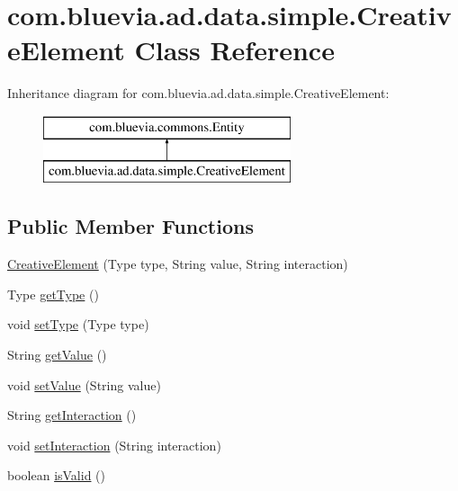 \hypertarget{classcom_1_1bluevia_1_1ad_1_1data_1_1simple_1_1CreativeElement}{
\section{com.bluevia.ad.data.simple.CreativeElement Class Reference}
\label{classcom_1_1bluevia_1_1ad_1_1data_1_1simple_1_1CreativeElement}
}
Inheritance diagram for com.bluevia.ad.data.simple.CreativeElement:\begin{figure}[H]
\begin{center}
\leavevmode
\includegraphics[height=2.000000cm]{classcom_1_1bluevia_1_1ad_1_1data_1_1simple_1_1CreativeElement}
\end{center}
\end{figure}
\subsection*{Public Member Functions}
\begin{DoxyCompactItemize}
\item 
\hyperlink{classcom_1_1bluevia_1_1ad_1_1data_1_1simple_1_1CreativeElement_ae082c9936a33daefb88653cb41b12ba3}{CreativeElement} (Type type, String value, String interaction)
\item 
Type \hyperlink{classcom_1_1bluevia_1_1ad_1_1data_1_1simple_1_1CreativeElement_a46c9d75110f3d403c79bc7cf868ce9ec}{getType} ()
\item 
void \hyperlink{classcom_1_1bluevia_1_1ad_1_1data_1_1simple_1_1CreativeElement_a7a096c4a8bf3cbe52dcff19cb5e0d7d3}{setType} (Type type)
\item 
String \hyperlink{classcom_1_1bluevia_1_1ad_1_1data_1_1simple_1_1CreativeElement_a4e6d515dc45f71bbb503bfcee16135b1}{getValue} ()
\item 
void \hyperlink{classcom_1_1bluevia_1_1ad_1_1data_1_1simple_1_1CreativeElement_ad5b36bfc47639ee2e3e6c97f918f51c7}{setValue} (String value)
\item 
String \hyperlink{classcom_1_1bluevia_1_1ad_1_1data_1_1simple_1_1CreativeElement_a217d542e3f9227b039d41a360ee44ea6}{getInteraction} ()
\item 
void \hyperlink{classcom_1_1bluevia_1_1ad_1_1data_1_1simple_1_1CreativeElement_a2934ea93513d82e6e2b1afe0f26ac7b5}{setInteraction} (String interaction)
\item 
boolean \hyperlink{classcom_1_1bluevia_1_1ad_1_1data_1_1simple_1_1CreativeElement_ae85f0619491bcc62e8efb75158a80c42}{isValid} ()
\end{DoxyCompactItemize}


